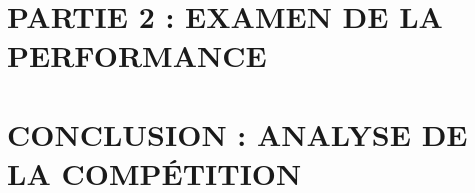 \documentclass[a4paper]{article}
\begin{document}
\section{PARTIE 2 : EXAMEN DE LA PERFORMANCE}


\section{CONCLUSION : ANALYSE DE LA COMPÉTITION}
\end{document}
